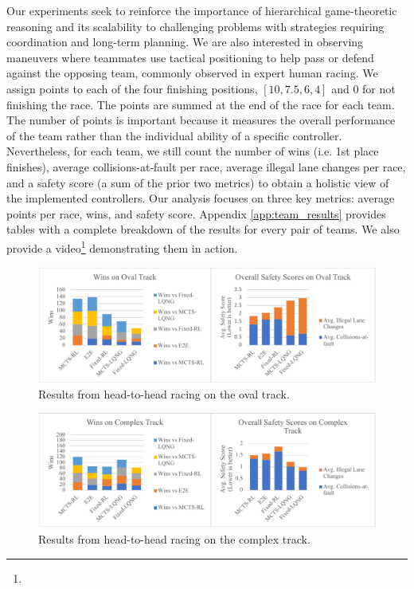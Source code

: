 Our experiments seek to reinforce the importance of hierarchical game-theoretic reasoning and its scalability to challenging problems with strategies requiring coordination and long-term planning. We are also interested in observing maneuvers where teammates use tactical positioning to help pass or defend against the opposing team, commonly observed in expert human racing. We assign points to each of the four finishing positions, $[10, 7.5, 6, 4]$ and $0$ for not finishing the race. The points are summed at the end of the race for each team. The number of points is important because it measures the overall performance of the team rather than the individual ability of a specific controller. Nevertheless, for each team, we still count the number of wins (i.e. 1st place finishes), average collisions-at-fault per race, average illegal lane changes per race, and a safety score (a sum of the prior two metrics) to obtain a holistic view of the implemented controllers. Our analysis focuses on three key metrics: average points per race, wins, and safety score. Appendix \ref{app:team_results} provides tables with a complete breakdown of the results for every pair of teams. We also provide a video\footnote{\vidurlteam} demonstrating them in action. 

\begin{figure}
  \centering
  \includegraphics[width=\textwidth]{Figures/TeamOvalResultsFinal.pdf}
  \caption{Results from head-to-head racing on the oval track.}
  \label{fig:team_results_oval}
\end{figure}
\begin{figure}
\centering
  \includegraphics[width=\textwidth]{Figures/TeamComplexResultsFinal.pdf}
  \caption{Results from head-to-head racing on the complex track.}
  \label{fig:team_results_complex}
\end{figure}

